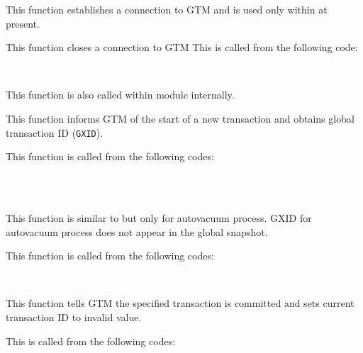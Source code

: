   
      This function establishes a connection to GTM 
      and is used only within  at present.
  
  
      This function closes a connection to GTM
	  This is called from the following code:
      
      \FuncRefHdr
		  \\ \hline
      \FuncRefTrailor
      
      This function is also called within  module internally.
  
  
      This function informs GTM of the start of a new transaction and obtains
      global transaction ID (\texttt{GXID}).
      
      This function is called from the following codes:
      
      \FuncRefHdr
		  \\
		  \\ \hline
      \FuncRefTrailor
  
  
      This function is similar to  but only for autovacuum process.
      GXID for autovacuum process does not appear in the global snapshot.
      
      This function is called from the following codes:
      
      \FuncRefHdr
		  \\ \hline
      \FuncRefTrailor
  
  
      This function tells GTM the specified transaction is committed and sets
      current transaction ID to invalid value.
      
      This is called from the following codes:
      
      \FuncRefHdr
		  \\ \hline
      \FuncRefTrailor
  
